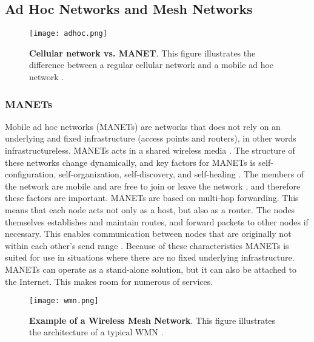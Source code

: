 \subsection{Ad Hoc Networks and Mesh Networks}

\begin{figure}[h!]
  \centering
    \texttt{[image: adhoc.png]}
     \caption [Cellular network vs. MANET]{\textbf{Cellular network vs. MANET}. This figure illustrates the difference between a regular cellular network and a mobile ad hoc network \cite{adhoc2}.}
\label{fig:adhoc}
\end{figure}

\subsubsection{MANETs} Mobile ad hoc networks (MANETs) are networks that does not rely on an underlying and fixed infrastructure (access points and routers), in other words infrastructureless. MANETs acts in a shared wireless media \cite{adhoc}. The structure of these networks change dynamically, and key factors for MANETs is self-configuration, self-organization, self-discovery, and self-healing \cite{wmn}. The members of the network are mobile and are free to join or leave the network \cite{adhoc2}, and therefore these factors are important. MANETs are based on multi-hop forwarding. This means that each node acts not only as a host, but also as a router. The nodes themselves establishes and maintain routes, and forward packets to other nodes if necessary. This enables communication between nodes that are originally not within each other's send range \cite{adhoc2}. Because of these characteristics MANETs is suited for use in situations where there are no fixed underlying infrastructure. MANETs can operate as a stand-alone solution, but it can also be attached to the Internet. This makes room for numerous of services. 

\begin{figure}[h!]
  \centering
    \texttt{[image: wmn.png]}
     \caption [Example of a Wireless Mesh Network]{\textbf{Example of a Wireless Mesh Network}. This figure illustrates the architecture of a typical WMN \cite{wmn}.}
\label{fig:wmn}
\end{figure}

